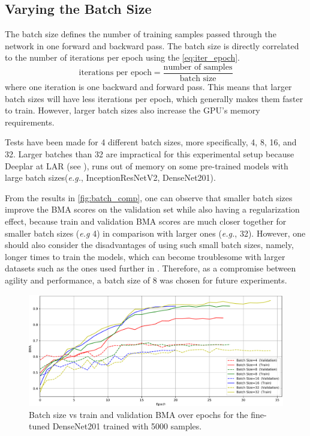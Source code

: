     \subsection{Varying the Batch Size}
    The batch size defines the number of training samples passed through the network in one forward and backward pass. The batch size is directly correlated to the number of iterations per epoch using the \autoref{eq:iter_epoch}.
        \begin{equation}
        \mbox{iterations per epoch}=\frac{\mbox{number of samples}}{\mbox{batch size}}
        \label{eq:iter_epoch}
        \end{equation}
    where one iteration is one backward and forward pass. This means that larger batch sizes will have less iterations per epoch, which generally makes them faster to train. However, larger batch sizes also increase the \ac{GPU}'s memory requirements. \par
    
    Tests have been made for 4 different batch sizes, more specifically, 4, 8, 16, and 32. Larger batches than 32 are impractical for this experimental setup because Deeplar at \ac{LAR} (see ), runs out of memory on some pre-trained models with large batch sizes(\textit{e.g.}, InceptionResNetV2, DenseNet201). \par

    From the results in \autoref{fig:batch_comp}, one can observe that smaller batch sizes improve the \ac{BMA} scores on the validation set while also having a regularization effect, because train and validation \ac{BMA} scores are much closer together for smaller batch sizes (\textit{e.g} 4) in comparison with larger ones (\textit{e.g.}, 32). However, one should also consider the disadvantages of using such small batch sizes, namely, longer times to train the models, which can become troublesome with larger datasets such as the ones used further in . Therefore, as a compromise between agility and performance, a batch size of 8 was chosen for future experiments. \par
    
    \begin{figure}[ht]
        \centering
        \includegraphics[width=\textwidth]{figs/densenet201_batch_over_epochs.pdf}
        \caption{Batch size vs train and validation \ac{BMA} over epochs for the fine-tuned DenseNet201 trained with 5000 samples.}
        \label{fig:batch_comp}
    \end{figure}  
    
